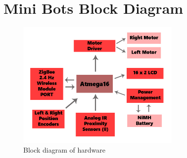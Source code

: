\documentclass[a4paper,12pt,oneside]{book}
\begin{document}
	\chapter{Mini Bots Block Diagram}
	
	\begin{figure}[h!]
		\centering\includegraphics[width=300px]{./Block_Diagram.jpg}
		\caption{Block diagram of hardware}
	\end{figure}
	\hfill\\
\end{document}
